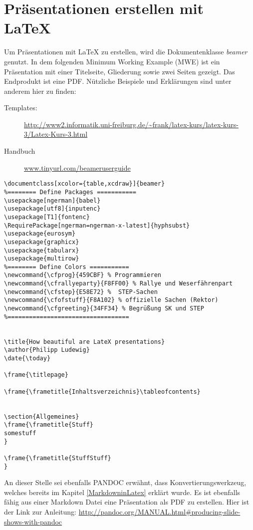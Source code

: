 \chapter{Präsentationen erstellen mit \LaTeX}
Um Präsentationen mit \LaTeX{} zu erstellen, wird die Dokumentenklasse \emph{beamer} genutzt. In dem folgenden Minimum Working Example (MWE) ist ein Präsentation mit einer Titelseite, Gliederung sowie zwei Seiten gezeigt. Das Endprodukt ist eine PDF. Nützliche Beispiele und Erklärungen sind unter anderem hier zu finden:
\begin{description}
	\item[Templates: ] \url{http://www2.informatik.uni-freiburg.de/~frank/latex-kurs/latex-kurs-3/Latex-Kurs-3.html}
	\item[Handbuch] \url{www.tinyurl.com/beameruserguide}
\end{description}
\begin{lstlisting}[style=LaTeX]
\documentclass[xcolor={table,xcdraw}]{beamer}
%======== Define Packages ===========
\usepackage[ngerman]{babel}
\usepackage[utf8]{inputenc}
\usepackage[T1]{fontenc}
\RequirePackage[ngerman=ngerman-x-latest]{hyphsubst}
\usepackage{eurosym}
\usepackage{graphicx} 
\usepackage{tabularx} 
\usepackage{multirow}
%======== Define Colors ===========
\newcommand{\cfprog}{459CBF} % Programmieren
\newcommand{\cfrallyeparty}{F8FF00} % Rallye und Weserfährenpart
\newcommand{\cfstep}{E58E72} %  STEP-Sachen 
\newcommand{\cfofstuff}{F8A102} % offizielle Sachen (Rektor)
\newcommand{\cfgreeting}{34FF34} % Begrüßung SK und STEP
%==================================	


\title{How beautiful are LateX presentations}   
\author{Philipp Ludewig} 
\date{\today} 

\frame{\titlepage} 

\frame{\frametitle{Inhaltsverzeichnis}\tableofcontents} 


\section{Allgemeines} 
\frame{\frametitle{Stuff} 
somestuff
}

\frame{\frametitle{StuffStuff}
}

\end{lstlisting}

An dieser Stelle sei ebenfalls PANDOC erwähnt, dass Konvertierungswerkzeug, welches bereits im Kapitel \ref{MarkdowninLatex} erklärt wurde. Es ist ebenfalls fähig aus einer Markdown Datei eine Präsentation als PDF zu erstellen. Hier ist der Link zur Anleitung: \url{http://pandoc.org/MANUAL.html#producing-slide-shows-with-pandoc}

